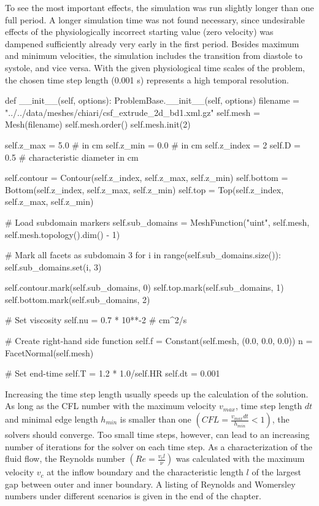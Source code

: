 To see the most important effects, the simulation was run slightly
longer than one full period. A longer simulation time was not found
necessary, since undesirable effects of the physiologically incorrect
starting value (zero velocity) was dampened sufficiently already very
early in the first period. Besides maximum and minimum velocities, the
simulation includes the transition from diastole to systole, and vice
versa.  With the given physiological time scales of the problem, the
chosen time step length (0.001 s) represents a high temporal
resolution.
\begin{python}
def __init__(self, options):
	ProblemBase.__init__(self, options)
	filename = "../../data/meshes/chiari/csf_extrude_2d_bd1.xml.gz"
	self.mesh = Mesh(filename)
	self.mesh.order()
	self.mesh.init(2)

	self.z_max = 5.0	# in cm
	self.z_min = 0.0	# in cm
	self.z_index = 2
	self.D = 0.5 		# characteristic diameter in cm

	self.contour = Contour(self.z_index, self.z_max, self.z_min)
	self.bottom = Bottom(self.z_index, self.z_max, self.z_min)
	self.top = Top(self.z_index, self.z_max, self.z_min)

	# Load subdomain markers
	self.sub_domains = MeshFunction("uint", self.mesh, self.mesh.topology().dim() - 1)

	# Mark all facets as subdomain 3
	for i in range(self.sub_domains.size()):
		self.sub_domains.set(i, 3)

	self.contour.mark(self.sub_domains, 0)
	self.top.mark(self.sub_domains, 1)
	self.bottom.mark(self.sub_domains, 2)

	# Set viscosity
	self.nu = 0.7 * 10**-2 # cm^2/s

	# Create right-hand side function
	self.f = Constant(self.mesh, (0.0, 0.0, 0.0))
	n = FacetNormal(self.mesh)

	# Set end-time
	self.T = 1.2 * 1.0/self.HR
	self.dt = 0.001
\end{python}

Increasing the time step length usually speeds up the calculation of
the solution. As long as the CFL number with the maximum velocity
$v_{max}$, time step length $dt$ and minimal edge length $h_{min}$ is
smaller than one $(CFL = \frac{v_{max} dt}{h_{min}} < 1)$, the solvers
should converge. Too small time steps, however, can lead to an
increasing number of iterations for the solver on each time step.  As
a characterization of the fluid flow, the Reynolds number $(Re =
\frac{v_c l}{\nu})$ was calculated with the maximum velocity $v_c$ at
the inflow boundary and the characteristic length $l$ of the largest
gap between outer and inner boundary. A listing of Reynolds and Womersley numbers
under different scenarios is given in the end of the chapter.

